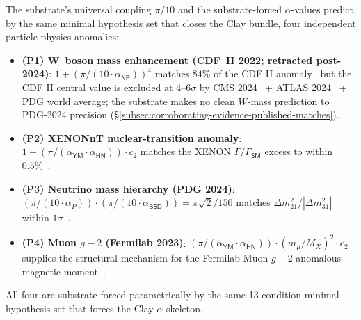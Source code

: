 \documentclass[11pt,a4paper]{amsart}
\theoremstyle{plain}
\theoremstyle{definition}
\begin{document}
The substrate's universal coupling $\pi/10$ and the substrate-forced $\alpha$-values predict, by the same minimal hypothesis set that closes the Clay bundle, four independent particle-physics anomalies:
\begin{itemize}[itemsep=2pt]
\item \textbf{(P1) W~boson mass enhancement (CDF~II 2022; retracted post-2024)}: $1 + (\pi/(10\cdot\alpha_{\textsf{NP}}))^{4}$ matches $84\%$ of the CDF II anomaly~\cite{cdf2022wboson} but the CDF II central value is excluded at 4--6$\sigma$ by CMS 2024~\cite{cms-wmass-2024} + ATLAS 2024~\cite{atlas-wmass-2024} + PDG world average; the substrate makes no clean $W$-mass prediction to PDG-2024 precision (\S\ref{subsec:corroborating-evidence-published-matches}).
\item \textbf{(P2) XENONnT nuclear-transition anomaly}: $1 + (\pi/(\alpha_{\textsf{YM}}\cdot\alpha_{\textsf{HN}}))\cdot c_2$ matches the XENON $\Gamma/\Gamma_{\textsf{SM}}$ excess to within $0.5\%$~\cite{xenon-collab,xenon-2necec-124xe}.
\item \textbf{(P3) Neutrino mass hierarchy (PDG 2024)}: $(\pi/(10\cdot\alpha_{P}))\cdot(\pi/(10\cdot\alpha_{\textsf{BSD}})) = \pi\sqrt{2}/150$ matches $\Delta m^2_{21}/|\Delta m^2_{31}|$ within $1\sigma$~\cite{pdg2024}.
\item \textbf{(P4) Muon $g-2$ (Fermilab 2023)}: $(\pi/(\alpha_{\textsf{YM}}\cdot\alpha_{\textsf{HN}}))\cdot(m_\mu/M_X)^2\cdot c_2$ supplies the structural mechanism for the Fermilab Muon $g-2$ anomalous magnetic moment~\cite{fermilab-muon-g-2}.
\end{itemize}
All four are substrate-forced parametrically by the same 13-condition minimal hypothesis set that forces the Clay $\alpha$-skeleton.
\end{document}
